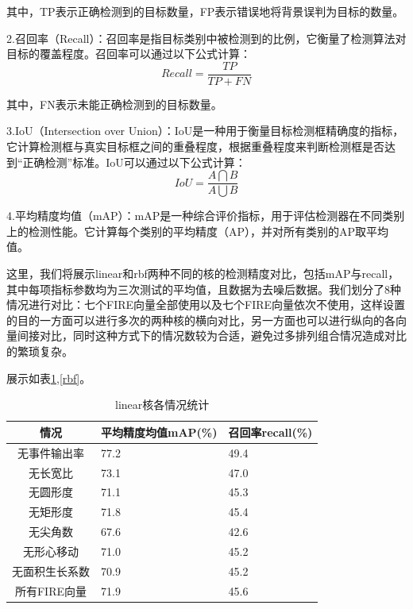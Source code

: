 其中，TP表示正确检测到的目标数量，FP表示错误地将背景误判为目标的数量。

2.召回率（Recall）：召回率是指目标类别中被检测到的比例，它衡量了检测算法对目标的覆盖程度。召回率可以通过以下公式计算：
\begin{equation} 
    Recall=\frac{TP}{TP+FN}
\end{equation}


其中，FN表示未能正确检测到的目标数量。

3.IoU（Intersection over Union）：IoU是一种用于衡量目标检测框精确度的指标，它计算检测框与真实目标框之间的重叠程度，根据重叠程度来判断检测框是否达到“正确检测”标准。IoU可以通过以下公式计算：
\begin{equation} 
    IoU=\frac{A\bigcap B}{A\bigcup B}
\end{equation}


4.平均精度均值（mAP）：mAP是一种综合评价指标，用于评估检测器在不同类别上的检测性能。它计算每个类别的平均精度（AP），并对所有类别的AP取平均值。

这里，我们将展示linear和rbf两种不同的核的检测精度对比，包括mAP与recall，其中每项指标参数均为三次测试的平均值，且数据为去噪后数据。我们划分了8种情况进行对比：七个FIRE向量全部使用以及七个FIRE向量依次不使用，这样设置的目的一方面可以进行多次的两种核的横向对比，另一方面也可以进行纵向的各向量间接对比，同时这种方式下的情况数较为合适，避免过多排列组合情况造成对比的繁琐复杂。

展示如表\ref{linear},\ref{rbf}。
\begin{table}[ht]
    \centering
    \caption{linear核各情况统计}
    \begin{tabularx}{0.7\textwidth}{c|X|X}
        \toprule
        情况&平均精度均值mAP(\%)&召回率recall(\%)\\
        \midrule
        无事件输出率&77.2&49.4\\
        无长宽比&73.1&47.0\\
        无圆形度&71.1&45.3\\
        无矩形度&71.8&45.4\\
        无尖角数&67.6&42.6\\
        无形心移动&71.0&45.2\\
        无面积生长系数&70.9&45.2\\
        所有FIRE向量&71.9&45.6\\
        \bottomrule
    \end{tabularx}
    \label{linear}
\end{table}






